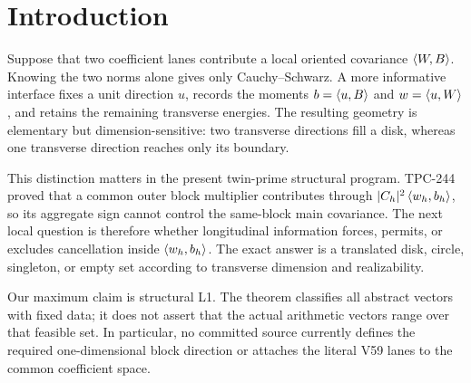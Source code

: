 \section{Introduction}

Suppose that two coefficient lanes contribute a local oriented covariance
$\left\langle W,B\right\rangle$.  Knowing the two norms alone gives only Cauchy--Schwarz.  A more
informative interface fixes a unit direction $u$, records the moments
$b=\left\langle u,B\right\rangle$ and $w=\left\langle u,W\right\rangle$, and retains the remaining transverse energies.
The resulting geometry is elementary but dimension-sensitive: two transverse
directions fill a disk, whereas one transverse direction reaches only its
boundary.

This distinction matters in the present twin-prime structural program.
TPC-244 proved that a common outer block multiplier contributes through
$|C_h|^2\left\langle w_h,b_h\right\rangle$, so its aggregate sign cannot control the same-block
main covariance.  The next local question is therefore whether longitudinal
information forces, permits, or excludes cancellation inside
$\left\langle w_h,b_h\right\rangle$.  The exact answer is a translated disk, circle, singleton, or
empty set according to transverse dimension and realizability.

Our maximum claim is structural L1.  The theorem classifies all abstract
vectors with fixed data; it does not assert that the actual arithmetic vectors
range over that feasible set.  In particular, no committed source currently
defines the required one-dimensional block direction or attaches the literal
V59 lanes to the common coefficient space.
